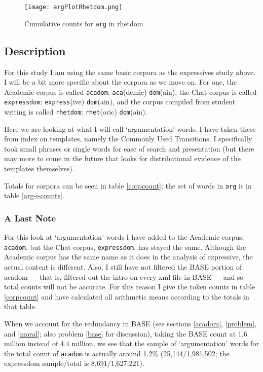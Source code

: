 \documentclass{article}
\begin{document}
\begin{figure}[!ht]
\texttt{[image: argPlotRhetdom.png]}
\caption{Cumulative counts for \texttt{arg} in rhetdom}
\end{figure}       

\subsection{Description}
For this study I am using the same basic corpora as the expressives study above. I will be a bit more specific about the corpora as we move on. For one, the Academic corpus is called \texttt{acadom}: \texttt{aca}(demic) \texttt{dom}(ain), the Chat corpus is called \texttt{expressdom}: \texttt{express}(ive) \texttt{dom}(ain), and the corpus compiled from student writing is called \texttt{rhetdom}: \texttt{rhet}(oric) \texttt{dom}(ain).

Here we are looking at what I will call `argumentation' words. I have taken these from  index on templates, namely the Commonly Used Transitions. I specifically took small phrases or single words for ease of search and presentation (but there may more to come in the future that looks for distributional evidence of the templates themselves).

Totals for corpora can be seen in table \ref{corpcount}; the set of words in \texttt{arg} is in table \ref{arg-i-counts}.

\subsubsection{A Last Note}
For this look at `argumentation' words I have added to the Academic corpus, \texttt{acadom}, but the Chat corpus, \texttt{expressdom}, has stayed the same. Although the Academic corpus has the same name as it does in the analysis of expressive, the actual content is different. Also, I still have not filtered the BASE portion of acadom --- that is, filtered out the intro on every xml file in BASE --- and so total counts will not be accurate. For this reason I give the token counts in table \ref{corpcount} and have calculated all arithmetic means according to the totals in that table.

When we account for the redundancy in BASE (see sections \ref{acadom}, \ref{problem}, and \ref{moral}; also problem \ref{base} for discussion), taking the BASE count at 1.6 million instead of 4.4 million, we see that the sample of `argumentation' words for the total count of \texttt{acadom} is actually around 1.2\% (25,144/1,981,502; the expressdom sample/total is 8,691/1,627,221).
\end{document}
